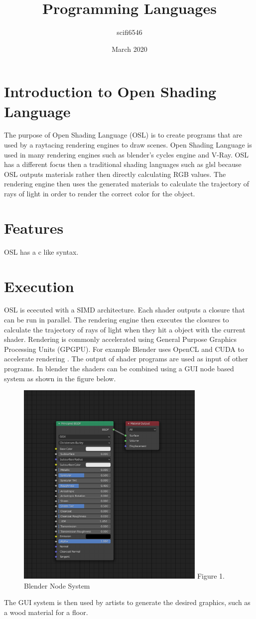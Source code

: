 \documentclass{article}
\title{Programming Languages}
\author{scifi6546 }
\date{March 2020}
\begin{document}
\maketitle

\section{Introduction to Open Shading Language}
The purpose of Open Shading Language (OSL) is to create programs that are used by a raytacing rendering engines to draw scenes. Open Shading Language is used in many rendering engines such as blender's cycles engine and V-Ray. OSL has a different focus then a traditional shading languages such as glsl because OSL outputs materials rather then directly calculating RGB values. The rendering engine then uses the generated materials to calculate the trajectory of rays of light in order to render the correct color for the object. 
\section{Features}
OSL has a c like syntax.
\section{Execution}
OSL is ececuted with a SIMD architecture. Each shader outputs a closure that can be run in parallel. The rendering engine then executes the closures to calculate the trajectory of rays of light when they hit a object with the current shader.  Rendering is commonly accelerated using General Purpose Graphics Processing Units (GPGPU). For example Blender uses OpenCL and CUDA to accelerate rendering \cite{blender_gpu}. The output of shader programs are used as input of other programs. In blender the shaders can be combined using a GUI node based system as shown in the figure below. \newline
\begin{figure}
  \includegraphics[height=10cm]{blender_nodes.png}\newline
  Figure 1. Blender Node System
  \centering
  \end{figure}
\newline
The GUI system is then used by artists to generate the desired graphics, such as a wood material for a floor.
\end{document}
